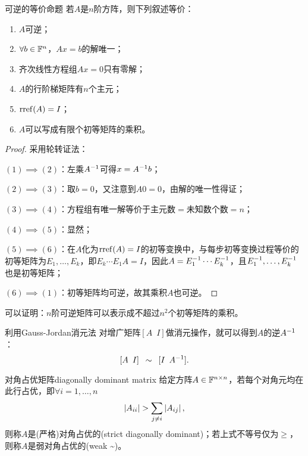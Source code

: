 \begin{theorem}
	{可逆的等价命题}{}
	若$A$是$n$阶方阵，则下列叙述等价：
	\begin{enumerate}
		\item $A$可逆；
		\item $\forall b\in\mathbb F^n$，$Ax=b$的解唯一；
		\item 齐次线性方程组$Ax=0$只有零解；
		\item $A$的行阶梯矩阵有$n$个主元；
		\item $\operatorname{rref}(A)=I$；
		\item $A$可以写成有限个初等矩阵的乘积。
	\end{enumerate}
\end{theorem}

\begin{proof}
	采用轮转证法：

	$(1)\implies(2)$：左乘$A^{-1}$可得$x=A^{-1} b$；

	$(2)\implies(3)$：取$b=0$，又注意到$A0=0$，由解的唯一性得证；

	$(3)\implies(4)$：方程组有唯一解等价于主元数$=$未知数个数$=n$；

	$(4)\implies(5)$：显然；

	$(5)\implies(6)$：在$A$化为$\operatorname{rref}(A)=I$的初等变换中，与每步初等变换过程等价的初等矩阵为$E_1,\ldots,E_k$，即$E_k\cdots E_1A=I$，因此$A=E_1^{-1}\cdots E_k^{-1}$，且$E_1^{-1},\ldots,E_k^{-1}$也是初等矩阵；

	$(6)\implies(1)$：初等矩阵均可逆，故其乘积$A$也可逆。
\end{proof}

\begin{remark}
	可以证明：$n$阶可逆矩阵可以表示成不超过$n^2$个初等矩阵的乘积。
\end{remark}

\begin{corollary}
	利用Gauss-Jordan消元法
	对增广矩阵$[A\enspace I]$做消元操作，就可以得到$A$的逆$A^{-1}$：
	\[
		[A\enspace I]\enspace\sim\enspace[I\enspace A^{-1}].
	\]
\end{corollary}

\begin{definition}
	{对角占优矩阵}{diagonally dominant matrix}
	给定方阵$A\in\mathbb F^{n\times n}$，若每个对角元均在此行占优，即$\forall i=1,\ldots,n$
	\begin{equation}
		\left\lvert A_{ii}\right\rvert>\sum_{j\neq i}\left\lvert A_{ij}\right\rvert,
	\end{equation}
	则称$A$是(严格)对角占优的(strict diagonally dominant)；若上式不等号仅为$\geq$，则称$A$是弱对角占优的(weak \textasciitilde)。
\end{definition}


